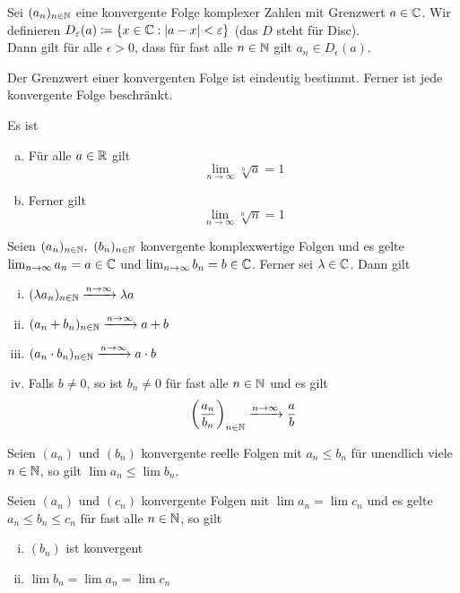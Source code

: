     \begin{bem}
        Sei $(a_n)_{n\in \mathbb{N}}$ eine konvergente Folge komplexer Zahlen mit Grenzwert $a\in \mathbb{C}$. Wir definieren $D_\varepsilon(a)\coloneqq \{x\in \mathbb{C}:\vert a-x \vert <\varepsilon\}$ (das $D$ steht für Disc).  \\
        Dann gilt für alle $\epsilon >0$, dass für fast alle $n\in \mathbb{N}$ gilt $a_n\in D_\epsilon(a)$.
    \end{bem}
    \begin{lemma}
        Der Grenzwert einer konvergenten Folge ist eindeutig bestimmt. Ferner ist jede konvergente Folge beschränkt.
    \end{lemma}
    \begin{bem}
        Es ist 
        \begin{enumerate}[(a)]
            \item Für alle $a\in \mathbb{R}$ gilt \[\lim_{n\to\infty} \sqrt[n]{a}=1 \]
            \item Ferner gilt \[\lim_{n\to \infty} \sqrt[n]{n}=1\]
        \end{enumerate}
    \end{bem}
    \begin{lemma}
        Seien $(a_n)_{n\in \mathbb{N}}, \ (b_n)_{n\in \mathbb{N}}$ konvergente komplexwertige Folgen und es gelte $\lim_{n\to \infty} a_n = a\in \mathbb{C}$ und $\lim_{n\to \infty} b_n =b\in \mathbb{C}$. Ferner sei $\lambda \in \mathbb{C}$. Dann gilt
        \begin{enumerate}[(i)]
            \item $(\lambda a_n)_{n\in \mathbb{N}} \xrightarrow{n \to \infty} \lambda a$
            \item $(a_n + b_n)_{n\in \mathbb{N}} \xrightarrow{n\to \infty} a+b$
            \item $(a_n\cdot b_n)_{n\in \mathbb{N}} \xrightarrow{n\to \infty} a\cdot b$
            \item Falls $b\neq 0$, so ist $b_n\neq 0$ für fast alle $n\in \mathbb{N}$ und es gilt 
            \[
            \left(\frac{a_n}{b_n}\right)_{n\in \mathbb{N}} \xrightarrow{n\to \infty} \frac{a}{b}    
            \]
        \end{enumerate}
    \end{lemma}
    \begin{lemma}
        Seien $(a_n)$ und $(b_n)$ konvergente reelle Folgen mit $a_n \le b_n$ für unendlich viele $n\in \mathbb{N}$, so gilt $\lim a_n \le \lim b_n$.
    \end{lemma}
    \begin{lemma}
        Seien $(a_n)$ und $(c_n)$ konvergente Folgen mit $\lim a_n = \lim c_n$ und es gelte $a_n\le b_n \le c_n$ für fast alle $n\in \mathbb{N}$, so gilt 
        \begin{enumerate}[(i)]
            \item $(b_n)$ ist konvergent 
            \item $\lim b_n = \lim a_n = \lim c_n$
        \end{enumerate}
    \end{lemma}
